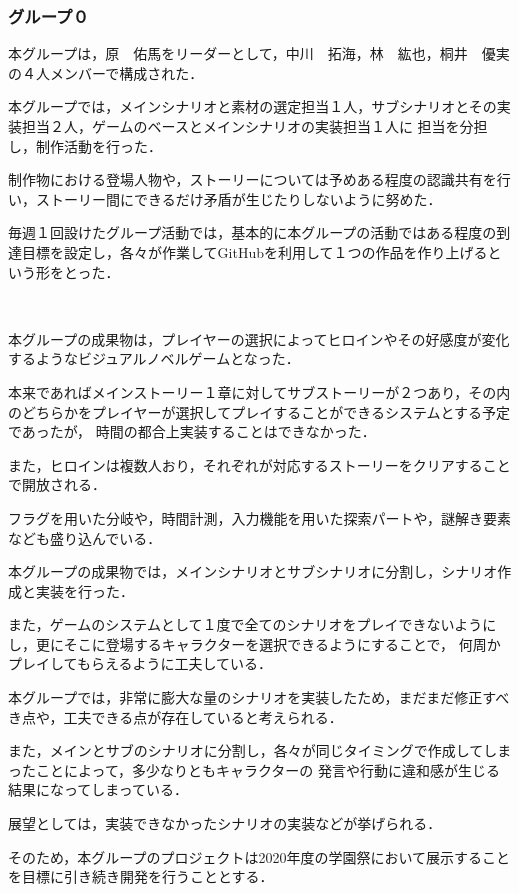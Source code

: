 \subsubsection{グループ０}
    
    本グループは，原　佑馬をリーダーとして，中川　拓海，林　紘也，桐井　優実の４人メンバーで構成された．

    本グループでは，メインシナリオと素材の選定担当１人，サブシナリオとその実装担当２人，ゲームのベースとメインシナリオの実装担当１人に
    担当を分担し，制作活動を行った．

    制作物における登場人物や，ストーリーについては予めある程度の認識共有を行い，ストーリー間にできるだけ矛盾が生じたりしないように努めた．

    毎週１回設けたグループ活動では，基本的に本グループの活動ではある程度の到達目標を設定し，各々が作業してGitHubを利用して１つの作品を作り上げるという形をとった．

    ~

    本グループの成果物は，プレイヤーの選択によってヒロインやその好感度が変化するようなビジュアルノベルゲームとなった．

    本来であればメインストーリー１章に対してサブストーリーが２つあり，その内のどちらかをプレイヤーが選択してプレイすることができるシステムとする予定であったが，
    時間の都合上実装することはできなかった．

    また，ヒロインは複数人おり，それぞれが対応するストーリーをクリアすることで開放される．
    
    フラグを用いた分岐や，時間計測，入力機能を用いた探索パートや，謎解き要素なども盛り込んでいる．


    本グループの成果物では，メインシナリオとサブシナリオに分割し，シナリオ作成と実装を行った．

    また，ゲームのシステムとして１度で全てのシナリオをプレイできないようにし，更にそこに登場するキャラクターを選択できるようにすることで，
    何周かプレイしてもらえるように工夫している．


    本グループでは，非常に膨大な量のシナリオを実装したため，まだまだ修正すべき点や，工夫できる点が存在していると考えられる．

    また，メインとサブのシナリオに分割し，各々が同じタイミングで作成してしまったことによって，多少なりともキャラクターの
    発言や行動に違和感が生じる結果になってしまっている．


    展望としては，実装できなかったシナリオの実装などが挙げられる．

    そのため，本グループのプロジェクトは2020年度の学園祭において展示することを目標に引き続き開発を行うこととする．
